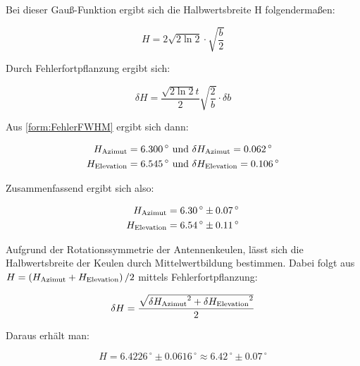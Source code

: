 Bei dieser Gauß-Funktion ergibt sich die Halbwertsbreite H folgendermaßen:

\begin{equation}
H = 2 \sqrt{2 \ln 2} \cdot \sqrt{\frac{b}{2}}
\end{equation}

Durch Fehlerfortpflanzung ergibt sich:

\begin{equation}
\delta H = \frac{\sqrt{2 \ln 2}t}{2} \sqrt{\frac{2}{b}} \cdot \delta b
\label{form:FehlerFWHM}
\end{equation}

Aus \eqref{form:FehlerFWHM} ergibt sich dann:

\begin{align*}
H_{\mathrm{Azimut}} = 6.300\,^\circ \ &\mathrm{und} \ \delta H_{\mathrm{Azimut}} = 0.062\,^\circ \\
H_{\mathrm{Elevation}} = 6.545\,^\circ \ &\mathrm{und} \ \delta H_{\mathrm{Elevation}} = 0.106\,^\circ
\end{align*}

Zusammenfassend ergibt sich also:

\begin{align}
H_{\mathrm{Azimut}} = 6.30\,^\circ \pm 0.07\,^\circ \\
H_{\mathrm{Elevation}} = 6.54\,^\circ \pm 0.11\,^\circ
\end{align}

Aufgrund der Rotationssymmetrie der Antennenkeulen, lässt sich die Halbwertsbreite der Keulen durch Mittelwertbildung bestimmen. Dabei folgt aus $ H = \left(H_{\mathrm{Azimut}} + H_{\mathrm{Elevation}}\right)/2 $ mittels Fehlerfortpflanzung:

\begin{equation}
\delta H = \frac{\sqrt{{\delta H_{\mathrm{Azimut}}}^2 + {\delta H_{\mathrm{Elevation}}}^2}}{2}
\end{equation}

Daraus erhält man:

\begin{equation}
H = 6.4226\,^\circ \pm 0.0616\,^\circ \approx 6.42\,^\circ \pm 0.07\,^\circ
\end{equation}